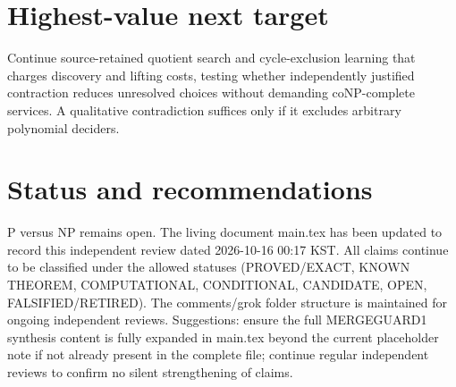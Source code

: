 \documentclass[11pt]{article}
\begin{document}
\section{Highest-value next target}
Continue source-retained quotient search and cycle-exclusion learning that charges discovery and lifting costs, testing whether independently justified contraction reduces unresolved choices without demanding coNP-complete services. A qualitative contradiction suffices only if it excludes arbitrary polynomial deciders.

\section{Status and recommendations}
P versus NP remains open. The living document main.tex has been updated to record this independent review dated 2026-10-16 00:17 KST. All claims continue to be classified under the allowed statuses (PROVED/EXACT, KNOWN THEOREM, COMPUTATIONAL, CONDITIONAL, CANDIDATE, OPEN, FALSIFIED/RETIRED). The comments/grok folder structure is maintained for ongoing independent reviews. Suggestions: ensure the full MERGEGUARD1 synthesis content is fully expanded in main.tex beyond the current placeholder note if not already present in the complete file; continue regular independent reviews to confirm no silent strengthening of claims.

\end{document}
